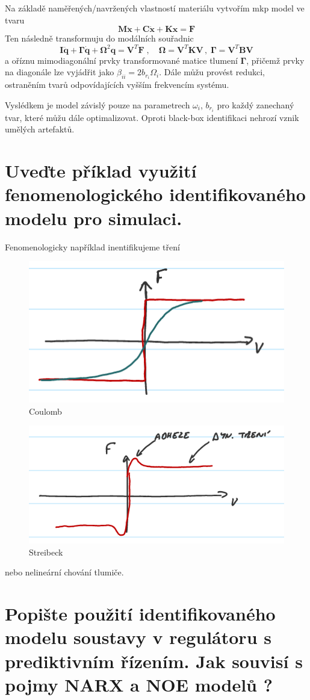 \documentclass{article}
\begin{document}
	Na základě naměřených/navržených vlastností materiálu vytvořím mkp model ve tvaru
	\begin{equation*}
		\bm{M}\bm{\ddot{x}} + \bm{C}\bm{\dot{x}} + \bm{K}\bm{x} = \bm{F}
	\end{equation*}
	Ten následně transformuju do modálních souřadnic
	\begin{equation*}
		\bm{I}\bm{\ddot{q}} + \bm{\Gamma}\bm{\dot{q}} + \bm{\Omega}^2 \bm{q} = \bm{V}^T \bm{F}
		\;,\quad 
		\bm{\Omega} = \bm{V}^T\bm{K}\bm{V}
		\,,\;
		\bm{\Gamma} = \bm{V}^T\bm{B}\bm{V}
	\end{equation*}
	a oříznu mimodiagonální prvky transformované matice tlumení $\bm{\Gamma}$, přičemž prvky na diagonále lze vyjádřit jako $\beta_{ii} = 2 b_{r_i} \Omega_i$. Dále můžu provést redukci, ostraněním tvarů odpovídajících vyšším frekvencím systému.

	Vyslédkem je model závislý pouze na parametrech $\omega_i$, $b_{r_i}$ 	pro každý zanechaný tvar, které můžu dále optimalizovat. Oproti black-box identifikaci nehrozí vznik umělých artefaktů.

	\section{Uveďte příklad využití fenomenologického identifikovaného modelu pro simulaci. }
	
	Fenomenologicky například inentifikujeme tření
	\begin{figure}[h!]
		\centering
		\includegraphics[width=0.5\linewidth]{figs/Coulomb.png}
		\caption{Coulomb}
	\end{figure}
	\begin{figure}[h!]
		\centering
		\includegraphics[width=0.5\linewidth]{figs/Streibeck.png}
		\caption{Streibeck}
	\end{figure}
	nebo nelineární chování tlumiče.

	\section{Popište použití identifikovaného modelu soustavy v regulátoru s prediktivním řízením. Jak souvisí s pojmy NARX a NOE modelů ? }
\end{document}
